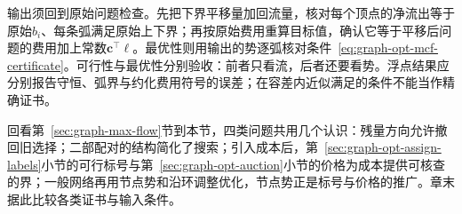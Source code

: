 输出须回到原始问题检查。先把下界平移量加回流量，核对每个顶点的净流出等于原始$b_i$、每条弧满足原始上下界；再按原始费用重算目标值，确认它等于平移后问题的费用加上常数$\bm c^{\top}\bm\ell$。最优性则用输出的势逐弧核对条件~\eqref{eq:graph-opt-mcf-certificate}。可行性与最优性分别验收：前者只看流，后者还要看势。浮点结果应分别报告守恒、弧界与约化费用符号的误差；在容差内近似满足的条件不能当作精确证书。

回看第~\ref{sec:graph-max-flow}节到本节，四类问题共用几个认识：残量方向允许撤回旧选择；二部配对的结构简化了搜索；引入成本后，第~\ref{sec:graph-opt-assign-labels}小节的可行标号与第~\ref{sec:graph-opt-auction}小节的价格为成本提供可核查的界；一般网络再用节点势和沿环调整优化，节点势正是标号与价格的推广。章末据此比较各类证书与输入条件。
